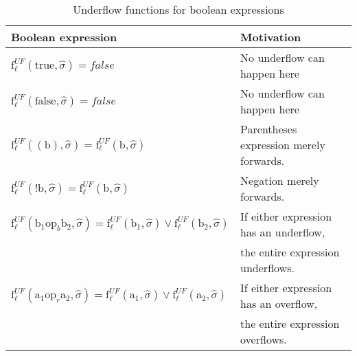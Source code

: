 \begin{table}[h]
\begin{tabular}{| l | l |}
  \hline
  Boolean expression & Motivation\\
  \hline
  \hline
  $\text{f}_\ell^{UF} (\text{true},\widehat{\sigma}) = false $ & No underflow can happen here\\ 
  \hline
  $\text{f}_\ell^{UF} (\text{false},\widehat{\sigma}) = false $ & No underflow can happen here\\ 
  \hline
  $\text{f}_\ell^{UF} ((\text{b}),\widehat{\sigma}) = \text{f}_\ell^{UF} (\text{b}, \widehat{\sigma}) $ & Parentheses expression merely forwards.\\ 
  \hline
    $\text{f}_\ell^{UF} (\text{!b},\widehat{\sigma}) = \text{f}_\ell^{UF} (\text{b}, \widehat{\sigma}) $ & Negation merely forwards.\\ 
  \hline
   $\text{f}_\ell^{UF} (\text{b}_1 \text{op}_b \text{b}_2, \widehat{\sigma}) = \text{f}_\ell^{UF} (\text{b}_1, \widehat{\sigma}) \vee \text{f}_\ell^{UF} (\text{b}_2, \widehat{\sigma})$ & If either expression has an underflow, 	\\ & the entire expression underflows.\\        
  \hline
     $\text{f}_\ell^{UF} (\text{a}_1 \text{op}_r \text{a}_2, \widehat{\sigma}) = \text{f}_\ell^{UF} (\text{a}_1, \widehat{\sigma}) \vee \text{f}_\ell^{UF} (\text{a}_2, \widehat{\sigma})$ & If either expression has an overflow, \\ & the entire expression overflows.\\     
  \hline
\end{tabular}
\centering
\caption{Underflow functions for boolean expressions}
\label{table:underflow_functions_boolean_expressions}
\end{table}




